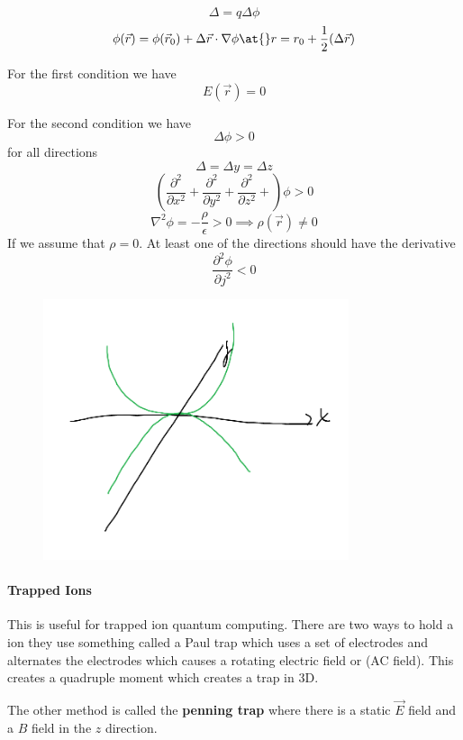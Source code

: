 \[
    \Delta = q \Delta \phi 
\]
\[
    \phi (\vec{r} ) = \phi (\vec{r} _0) + \Delta \vec{r} \cdot \nabla  \phi \at{}r = r_0{}{} 
    + \frac{1}{2} (\Delta \vec{r}  )
\]

For the first condition we have 
\[
    E (\vec{r} )= 0 
\]

For the second condition we have 
\[
    \Delta \phi  > 0
\]
for all directions 
\[
     \Delta = \Delta y = \Delta z
\]
\[
    \left(  \frac{\partial ^{2} }{\partial x ^{2} } + 
    \frac{\partial ^{2} }{\partial y ^{2} } + 
    \frac{\partial ^{2} }{\partial z ^{2} } + 
    \right) \phi  > 0
\]
\[
    \nabla ^{2}  \phi  = - \frac{\rho}{\epsilon } > 0\implies  \rho (\vec{r} ) \neq  0 
\]
If we assume that \(\rho = 0\). At least one of the directions should have the derivative 
\[
    \frac{\partial ^{2}  \phi }{\partial j ^{2} } < 0 
\] 
\begin{figure}[H]
    \centering
    \includegraphics[width=0.8\textwidth]{Figures/02.png}
    \caption{}
    \label{fig:}
\end{figure}
\paragraph{Trapped Ions}
\begin{eg}
This is useful for trapped ion quantum computing. There are two ways to hold a ion they use something 
called a Paul trap which uses a set of electrodes and alternates the electrodes which causes a rotating 
electric field or (AC field). This creates a quadruple moment which creates a trap in 3D. 

The other method is called the \textbf{penning trap}  where there is a static \(\vec{E} \)  field 
and a \(B\)  field in the \(z \)  direction. 
\end{eg}

